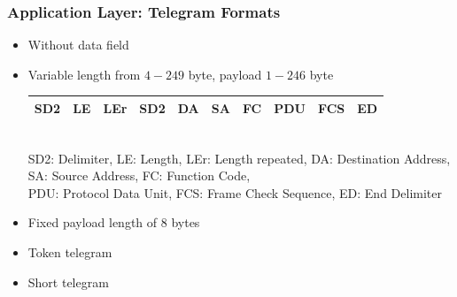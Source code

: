 \documentclass{beamer}
\begin{document}
\begin{frame}
  \frametitle{Application Layer: Telegram Formats}
  \begin{itemize}
    \item Without data field \\
    \item Variable length from $4-249$ byte, payload $1-246$ byte \\
      \footnotesize
      \begin{tabular}[h]{|c|c|c|c|c|c|c|c|c|c|}
        \hline
        SD2 & LE & LEr & SD2 & DA & SA & FC & PDU & FCS & ED \\
        \hline
      \end{tabular} \\
      \vspace{3pt}
      \tiny
      SD2: Delimiter, LE: Length, LEr: Length repeated, DA: Destination Address,
      SA: Source Address, FC: Function Code, \\
      \vspace{-5pt}
      PDU: Protocol Data Unit, FCS: Frame Check Sequence, ED: End Delimiter
      \normalsize
    \item Fixed payload length of $8$ bytes
    \item Token telegram
    \item Short telegram

\end{itemize}
\end{frame}
\end{document}
